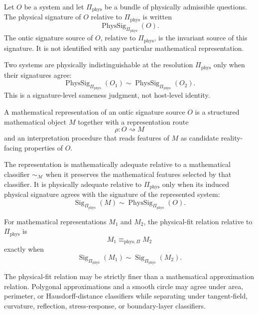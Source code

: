 \begin{definition}
\label{def:ontic-signature-source}
Let $O$ be a system and let $\Pi_{\mathrm{phys}}$ be a bundle of physically admissible questions. The physical signature of $O$ relative to $\Pi_{\mathrm{phys}}$ is written
$$
\operatorname{PhysSig}_{\Pi_{\mathrm{phys}}}(O).
$$
The ontic signature source of $O$, relative to $\Pi_{\mathrm{phys}}$, is the invariant source of this signature. It is not identified with any particular mathematical representation.
\end{definition}

Two systems are physically indistinguishable at the resolution $\Pi_{\mathrm{phys}}$ only when their signatures agree:
$$
\operatorname{PhysSig}_{\Pi_{\mathrm{phys}}}(O_1)
\sim
\operatorname{PhysSig}_{\Pi_{\mathrm{phys}}}(O_2).
$$
This is a signature-level sameness judgment, not host-level identity.

\begin{definition}
\label{def:reality-constrained-mathematical-representation}
A mathematical representation of an ontic signature source $O$ is a structured mathematical object $M$ together with a representation route
$$
\rho:O\rightsquigarrow M
$$
and an interpretation procedure that reads features of $M$ as candidate reality-facing properties of $O$.
\end{definition}

The representation is mathematically adequate relative to a mathematical classifier $\sim_{\mathcal M}$ when it preserves the mathematical features selected by that classifier. It is physically adequate relative to $\Pi_{\mathrm{phys}}$ only when its induced physical signature agrees with the signature of the represented system:
$$
\operatorname{Sig}_{\Pi_{\mathrm{phys}}}(M)
\sim
\operatorname{PhysSig}_{\Pi_{\mathrm{phys}}}(O).
$$

\begin{definition}
\label{def:physical-fit-relation}
For mathematical representations $M_1$ and $M_2$, the physical-fit relation relative to $\Pi_{\mathrm{phys}}$ is
$$
M_1\equiv_{\mathrm{phys},\Pi}M_2
$$
exactly when
$$
\operatorname{Sig}_{\Pi_{\mathrm{phys}}}(M_1)
\sim
\operatorname{Sig}_{\Pi_{\mathrm{phys}}}(M_2).
$$
\end{definition}

The physical-fit relation may be strictly finer than a mathematical approximation relation. Polygonal approximations and a smooth circle may agree under area, perimeter, or Hausdorff-distance classifiers while separating under tangent-field, curvature, reflection, stress-response, or boundary-layer classifiers.

